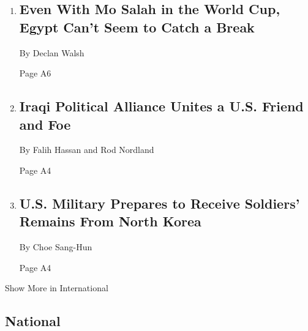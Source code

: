 \begin{enumerate}
\def\labelenumi{\arabic{enumi}.}
\item
  \href{/2018/06/23/world/middleeast/world-cup-mohamed-salah-egypt.html}{}

  \hypertarget{even-with-mo-salah-in-the-world-cup-egypt-cant-seem-to-catch-a-break-1}{%
  \subsection{Even With Mo Salah in the World Cup, Egypt Can't Seem to
  Catch a
  Break}\label{even-with-mo-salah-in-the-world-cup-egypt-cant-seem-to-catch-a-break-1}}

  By Declan Walsh

  Page A6
\item
  \href{/2018/06/23/world/middleeast/iraq-elections-prime-minister.html}{}

  \hypertarget{iraqi-political-alliance-unites-a-us-friend-and-foe}{%
  \subsection{Iraqi Political Alliance Unites a U.S. Friend and
  Foe}\label{iraqi-political-alliance-unites-a-us-friend-and-foe}}

  By Falih Hassan and Rod Nordland

  Page A4
\item
  \href{/2018/06/23/world/asia/soldiers-remains-north-korea.html}{}

  \hypertarget{us-military-prepares-to-receive-soldiers-remains-from-north-korea}{%
  \subsection{U.S. Military Prepares to Receive Soldiers' Remains From
  North
  Korea}\label{us-military-prepares-to-receive-soldiers-remains-from-north-korea}}

  By Choe Sang-Hun

  Page A4
\end{enumerate}

Show More in International

\hypertarget{national}{%
\subsection{National}\label{national}}

